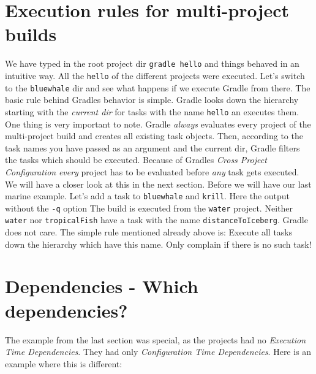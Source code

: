 \section{Execution rules for multi-project builds} %
\label{sec:execution_rules_for_multi_project_builds}
We have typed in the root project dir \texttt{gradle hello} and things behaved in an intuitive way. All the \texttt{hello} of the different projects were executed. Let's switch to the \texttt{bluewhale} dir and see what happens if we execute Gradle from there. 
The basic rule behind Gradles behavior is simple. Gradle looks down the hierarchy starting with the \emph{current dir} for tasks with the name \texttt{hello} an executes them. One thing is very important to note. Gradle \emph{always} evaluates every project of the multi-project build and creates all existing task objects. Then, according to the task names you have passed as an argument and the current dir, Gradle filters the tasks which should be executed. Because of Gradles \emph{Cross Project Configuration} \emph{every} project has to be evaluated before \emph{any} task gets executed. We will have a closer look at this in the next section. Before we will have our last marine example. Let's add a task to \texttt{bluewhale} and \texttt{krill}.
Here the output without the \texttt{-q} option
The build is executed from the \texttt{water} project. Neither \texttt{water} nor \texttt{tropicalFish} have a task with the name \texttt{distanceToIceberg}. Gradle does not care. The simple rule mentioned already above is: Execute all tasks down the hierarchy which have this name. Only complain if there is no such task!

\section{Dependencies - Which dependencies?} %
\label{sec:dependencies_which_dependencies_}
The example from the last section was special, as the projects had no \emph{Execution Time Dependencies}. They had only \emph{Configuration Time Dependencies}. Here is an example where this is different:


